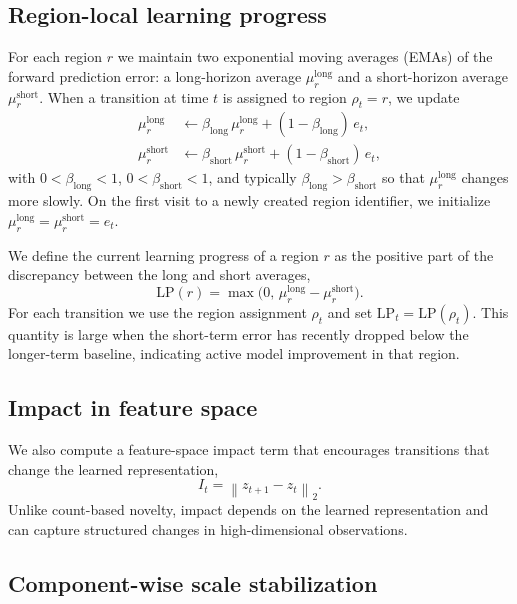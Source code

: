 \subsection{Region-local learning progress}

For each region $r$ we maintain two exponential moving averages (EMAs) of the forward prediction error: a long-horizon average $\mu^{\mathrm{long}}_r$ and a short-horizon average $\mu^{\mathrm{short}}_r$.
When a transition at time $t$ is assigned to region $\rho_t=r$, we update
\begin{align}
    \mu^{\mathrm{long}}_r &\leftarrow \beta_{\mathrm{long}}\,\mu^{\mathrm{long}}_r + (1-\beta_{\mathrm{long}})\,e_t,\\
    \mu^{\mathrm{short}}_r &\leftarrow \beta_{\mathrm{short}}\,\mu^{\mathrm{short}}_r + (1-\beta_{\mathrm{short}})\,e_t,
\end{align}
with $0<\beta_{\mathrm{long}}<1$, $0<\beta_{\mathrm{short}}<1$, and typically $\beta_{\mathrm{long}}>\beta_{\mathrm{short}}$ so that $\mu^{\mathrm{long}}_r$ changes more slowly.
On the first visit to a newly created region identifier, we initialize $\mu^{\mathrm{long}}_r=\mu^{\mathrm{short}}_r=e_t$.

We define the current learning progress of a region $r$ as the positive part of the discrepancy between the long and short averages,
\begin{equation}
    \mathrm{LP}(r) = \max\big(0,\,\mu^{\mathrm{long}}_{r}-\mu^{\mathrm{short}}_{r}\big).
\end{equation}
For each transition we use the region assignment $\rho_t$ and set $\mathrm{LP}_t=\mathrm{LP}(\rho_t)$.
This quantity is large when the short-term error has recently dropped below the longer-term baseline, indicating active model improvement in that region.

\subsection{Impact in feature space}

We also compute a feature-space impact term that encourages transitions that change the learned representation,
\begin{equation}
    I_t = \left\lVert z_{t+1}-z_t \right\rVert_2.
\end{equation}
Unlike count-based novelty, impact depends on the learned representation and can capture structured changes in high-dimensional observations.

\subsection{Component-wise scale stabilization}

